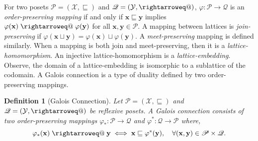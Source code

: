 \documentclass[11pt]{article}
\makeatletter
\newtheorem{definition}[theorem]{Definition}
\DeclareMathOperator{\raisedrightarrow}{\raisebox{+0.15ex}{$\rightarrow$}}
\newcommand{\rightarroweq}{\mathrel{\mathpalette\rightarroweq@\relax}}
\newcommand{\rightarroweq@}[2]{%
  \vtop{
      \sbox\z@{$\m@th#1\raisedrightarrow$}%
    \ialign{%
      \hfil##\hfil\cr
      \copy\z@\cr
      \noalign{\nointerlineskip\kern0.7\ht\z@}
      \makebox[\wd\z@][s]{$\m@th#1\relbar\hss\relbar$}\cr
      \noalign{\kern-0.7\ht\z@}
    }%
  }%
}
\makeatother
\begin{document}
For two posets $\mathscr{P} = (\mathcal{X},\sqsubseteq)$ and $\mathscr{Q} = (\mathcal{Y},\rightarroweq)$, $\varphi:\mathscr{P} \to \mathscr{Q}$ is an \emph{order-preserving mapping} if and only if $\mathbf{x} \sqsubseteq \mathbf{y}$ implies $\varphi(\mathbf{x}) \rightarroweq \varphi(\mathbf{y})$ for all $\mathbf{x},\mathbf{y}\in\mathscr{P}$.
A mapping between lattices is \emph{join-preserving} if $\varphi(\mathbf{x} \sqcup \mathbf{y}) = \varphi(\mathbf{x})\sqcup \varphi(\mathbf{y})$.
A \emph{meet-preserving} mapping is defined similarly.
When a mapping is both join and meet-preserving, then it is a \emph{lattice-homomorphism}.
An injective lattice-homomorphism is a \emph{lattice-embedding}.
Observe, the domain of a lattice-embedding is isomorphic to a sublattice of the codomain.
A Galois connection is a type of duality defined by two order-preserving mappings.
\begin{definition}[Galois Connection]
    Let $\mathscr{P} = (\mathcal{X},\sqsubseteq)$ and $\mathscr{Q} = (\mathcal{Y},\rightarroweq)$ be reflexive posets.
    A \emph{Galois connection} consists of two order-preserving mappings $\varphi_*:\mathscr{P}\to\mathscr{Q}$ and $\varphi^*:\mathscr{Q} \to \mathscr{P}$ where,
    \[
        \varphi_*(\mathbf{x}) \rightarroweq \mathbf{y} \iff \mathbf{x} \sqsubseteq \varphi^*(\mathbf{y}),\quad\forall (\mathbf{x},\mathbf{y})\in\mathscr{P}\times\mathscr{Q}.
    \]
\end{definition}
\end{document}
